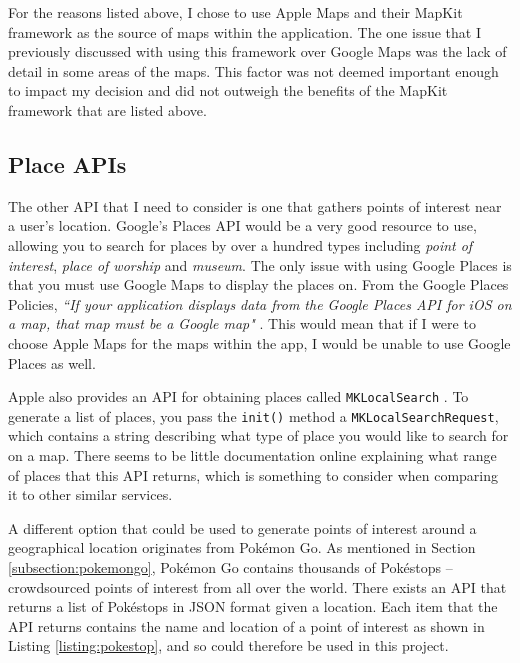 For the reasons listed above, I chose to use Apple Maps and their MapKit framework as the source of maps within the application. The one issue that I previously discussed with using this framework over Google Maps was the lack of detail in some areas of the maps. This factor was not deemed important enough to impact my decision and did not outweigh the benefits of the MapKit framework that are listed above.

\subsection{Place APIs}

The other API that I need to consider is one that gathers points of interest near a user's location. Google's Places API \cite{GoogleInc.b} would be a very good resource to use, allowing you to search for places by over a hundred types including \textit{point of interest}, \textit{place of worship} and \textit{museum}. The only issue with using Google Places is that you must use Google Maps to display the places on. From the Google Places Policies, \textit{``If your application displays data from the Google Places API for iOS on a map, that map must be a Google map"} \cite{GoogleInc.c}. This would mean that if I were to choose Apple Maps for the maps within the app, I would be unable to use Google Places as well.

Apple also provides an API for obtaining places called \texttt{MKLocalSearch} \cite{AppleInc.b}. To generate a list of places, you pass the \texttt{init()} method a \texttt{MKLocalSearchRequest}, which contains a string describing what type of place you would like to search for on a map. There seems to be little documentation online explaining what range of places that this API returns, which is something to consider when comparing it to other similar services.

A different option that could be used to generate points of interest around a geographical location originates from Pok\'{e}mon Go. As mentioned in Section \ref{subsection:pokemongo}, Pok\'{e}mon Go contains thousands of Pok\'{e}stops -- crowdsourced points of interest from all over the world. There exists an API \cite{Selwyn} that returns a list of Pok\'{e}stops in JSON format given a location. Each item that the API returns contains the name and location of a point of interest as shown in Listing \ref{listing:pokestop}, and so could therefore be used in this project.

\medskip

